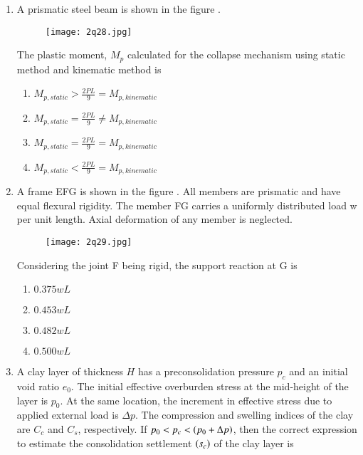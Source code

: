 \documentclass[journal,12pt,onecolumn]{article}
\theoremstyle{remark}
\begin{document}
\begin{enumerate}
\item A prismatic steel beam is shown in the figure  .
\begin{figure}[H]
    \centering
    \texttt{[image: 2q28.jpg]}
    \caption{}
    \label{fig:q28}
\end{figure}
The plastic moment, $M_p$ calculated for the collapse mechanism using static method and kinematic method is

\hfill{}

\begin{enumerate}
    \item $M_{p,static} > \frac{2PL}{9} = M_{p,kinematic}$
    \item $M_{p,static} = \frac{2PL}{9} \ne M_{p,kinematic}$
    \item $M_{p,static} = \frac{2PL}{9} = M_{p,kinematic}$
    \item $M_{p,static} < \frac{2PL}{9} = M_{p,kinematic}$
\end{enumerate}

\item A frame EFG is shown in the figure  . All members are prismatic and have equal flexural rigidity. The member FG carries a uniformly distributed load w per unit length. Axial deformation of any member is neglected.
\begin{figure}[H]
    \centering
    \texttt{[image: 2q29.jpg]}
    \caption{}
    \label{fig:q29}
\end{figure}
Considering the joint F being rigid, the support reaction at G is

\hfill{}

\begin{multicols}{2}
\begin{enumerate}
    \item $0.375 wL$
    \item $0.453 wL$
    \item $0.482 wL$
    \item $0.500 wL$
\end{enumerate}
\end{multicols}

\item A clay layer of thickness $H$ has a preconsolidation pressure $p_c$ and an initial void ratio $e_0$. The initial effective overburden stress at the mid-height of the layer is $p_0$. At the same location, the increment in effective stress due to applied external load is $\Delta p$. The compression and swelling indices of the clay are $C_c$ and $C_s$, respectively. If $p_0 < p_c < \left(p_0 + \Delta p\right)$, then the correct expression to estimate the consolidation settlement $\left(s_c\right)$ of the clay layer is


\end{enumerate}
\end{document}
